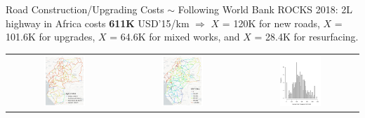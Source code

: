 \documentclass[aspectratio=169,xcolor=dvipsnames]{beamer}
\begin{document}
\begin{frame}{Road Construction/Upgrading Costs $\sim$ Following \citet{collier2016cost}} \vspace{-2mm}
\small World Bank ROCKS 2018: 
2L highway in Africa costs \textbf{611K} USD'15/km $\Rightarrow$ $X$ = 120K for new roads, $X$ = 101.6K for upgrades, $X$ = 64.6K for mixed works, and $X$ = 28.4K for resurfacing.
\begin{adjustbox}{center}
\begin{tabular}{@{}c@{}c@{}@{}c@{}} 
\includegraphics[width=0.38\textwidth, trim= {0.9cm 0 0.9cm 0}, clip]{"../figures/trans_CEMAC_network_type_of_work_google.pdf"} & 
\includegraphics[width=0.38\textwidth, trim= {0.9cm 0 0.9cm 0}, clip]{"../figures/trans_CEMAC_network_all_costs_conflict_google.pdf"} & 
\includegraphics[width=0.38\textwidth, trim= {0.5cm 0 0.5cm 2cm}, clip]{"../figures/trans_CEMAC_network_all_costs_conflict_hist_google.pdf"} 
\end{tabular}
\end{adjustbox}
\end{frame}
\end{document}
